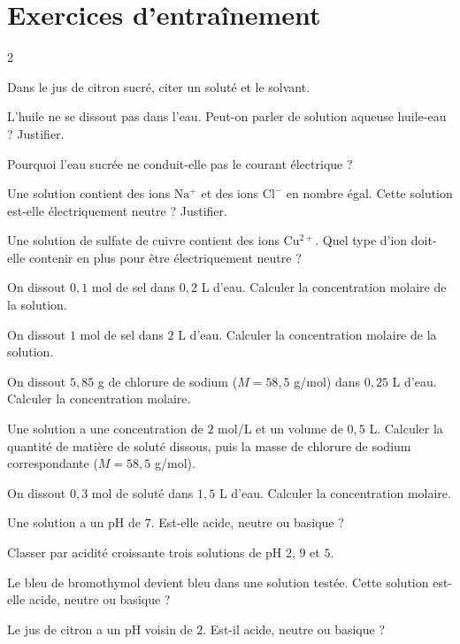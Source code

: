 \section{Exercices d'entraînement}
\begin{multicols}{2}

\exo{} Dans le jus de citron sucré, citer un soluté et le solvant.

\exo{} L'huile ne se dissout pas dans l'eau. Peut-on parler de solution aqueuse
huile-eau ? Justifier.

\exo{} Pourquoi l'eau sucrée ne conduit-elle pas le courant électrique ?

\exo{} Une solution contient des ions $\mathrm{Na^+}$ et des ions $\mathrm{Cl^-}$
en nombre égal. Cette solution est-elle électriquement neutre ? Justifier.

\exo{} Une solution de sulfate de cuivre contient des ions $\mathrm{Cu^{2+}}$.
Quel type d'ion doit-elle contenir en plus pour être électriquement neutre ?

\exo{} On dissout $0{,}1$ mol de sel dans $0{,}2$ L d'eau. Calculer la
concentration molaire de la solution.

\exo{} On dissout $1$ mol de sel dans $2$ L d'eau. Calculer la concentration
molaire de la solution.

\exo{} On dissout $5{,}85$ g de chlorure de sodium ($M=58{,}5$ g/mol) dans
$0{,}25$ L d'eau. Calculer la concentration molaire.

\exo{} Une solution a une concentration de $2$ mol/L et un volume de $0{,}5$ L.
Calculer la quantité de matière de soluté dissous, puis la masse de chlorure de sodium
correspondante ($M=58{,}5$ g/mol).

\exo{} On dissout $0{,}3$ mol de soluté dans $1{,}5$ L d'eau. Calculer la
concentration molaire.

\exo{} Une solution a un pH de $7$. Est-elle acide, neutre ou basique ?

\exo{} Classer par acidité croissante trois solutions de pH $2$, $9$ et $5$.

\exo{} Le bleu de bromothymol devient bleu dans une solution testée. Cette
solution est-elle acide, neutre ou basique ?

\exo{} Le jus de citron a un pH voisin de $2$. Est-il acide, neutre ou basique ?


\end{multicols}
